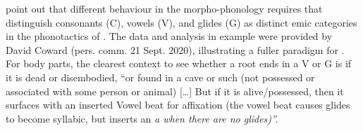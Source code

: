 


\citet{CowardCoward2000} point out that different behaviour in
the morpho-phonology requires that  distinguish consonants
(C), vowels (V), and glides (G) as distinct emic categories in the phonotactics of .
The data and analysis in example  were provided by
David Coward (pers. comm. 21 Sept.
2020), illustrating a fuller paradigm for .
For body parts, the clearest context to see whether a 
root ends in a V or G is if it is dead or disembodied,
“or found in a cave or such (not possessed or associated with
some person or animal) [{\ldots}] But if it is alive/possessed,
then it surfaces with an inserted Vowel beat for  affixation
(the vowel beat causes glides to become syllabic,
but inserts an \it{a} when there are no glides)”.


